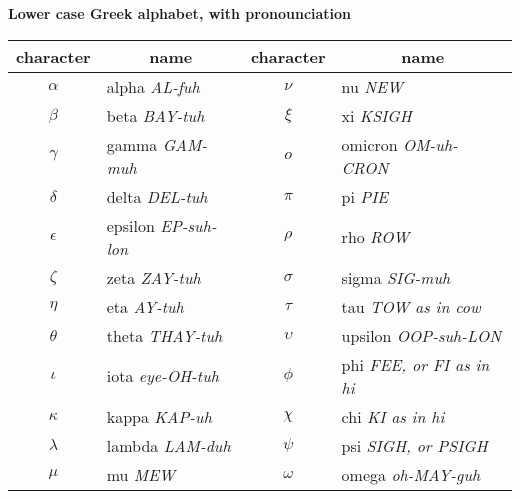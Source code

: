 \begin{center}
  \textbf{Lower case Greek alphabet, with pronounciation}
    \\[1ex]
  \newcommand{\pronounced}[1]{\hspace*{.2em}\small\textit{#1}}
  \begin{tabular}{cl@{\hspace*{3em}}cl}
    character &\multicolumn{1}{c}{name}       
    &character  &\multicolumn{1}{c}{name}  \\ 
    \hline
     \( \alpha  \) &alpha \pronounced{AL-fuh}  
       &\( \nu     \)  &nu  \pronounced{NEW}       \\
     \( \beta   \) &beta  \pronounced{BAY-tuh}     
       &\( \xi  \)  &xi   \pronounced{KSIGH}    \\ 
     \( \gamma  \) &gamma  \pronounced{GAM-muh}    
       &\( o       \) &omicron  \pronounced{OM-uh-CRON}  \\
     \( \delta  \) &delta  \pronounced{DEL-tuh}   
       &\( \pi \) &pi  \pronounced{PIE}     \\
     \( \epsilon\) &epsilon  \pronounced{EP-suh-lon}   
       &\( \rho \) &rho  \pronounced{ROW}    \\
     \( \zeta   \) &zeta   \pronounced{ZAY-tuh}    
       &\( \sigma  \) &sigma  \pronounced{SIG-muh}  \\
     \( \eta    \) &eta  \pronounced{AY-tuh}      
       &\( \tau \) &tau  \pronounced{TOW as in cow}    \\
     \( \theta  \) &theta  \pronounced{THAY-tuh}    
       &\( \upsilon\) &upsilon  \pronounced{OOP-suh-LON}  \\
     \( \iota \) &iota \pronounced{eye-OH-tuh}   
       &\( \phi    \) &phi  \pronounced{FEE, or FI as in hi}    \\
     \( \kappa  \) &kappa  \pronounced{KAP-uh}  
       &\( \chi    \) &chi  \pronounced{KI as in hi}    \\
     \( \lambda \) &lambda  \pronounced{LAM-duh}  
       &\( \psi    \) &psi \pronounced{SIGH, or PSIGH}    \\
     \( \mu  \)  &mu  \pronounced{MEW}     
       &\( \omega  \) &omega  \pronounced{oh-MAY-guh}  
  \end{tabular}
\end{center}
\vfill
%
